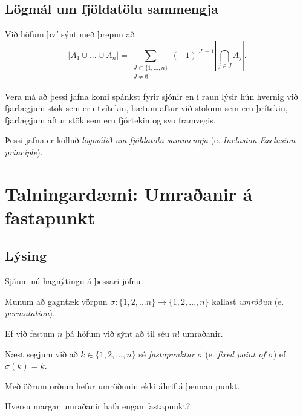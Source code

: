 \subsection{Lögmál um fjöldatölu sammengja}
{
    {
        \item<1-> Við höfum því sýnt með þrepun að
        \[
            |A_1 \cup ... \cup A_n|
            =
            \sum_{\substack{J \subset \{1, ..., n\} \\ J \neq \emptyset}} (-1)^{|J| - 1} \left | \bigcap_{j \in J} A_j \right |.
        \]
        \item<2-> Vera má að þessi jafna komi spánkst fyrir sjónir en í raun lýsir hún hvernig við fjarlægjum stök sem eru tvítekin,
                    bætum aftur við stökum sem eru þrítekin,
                    fjarlægjum aftur stök sem eru fjórtekin
                    og svo framvegis.
        \item<3-> Þessi jafna er kölluð \emph{lögmálið um fjöldatölu sammengja} (e. \emph{Inclusion-Exclusion principle}).
    }
}

\section{Talningardæmi: Umraðanir á fastapunkt}
\subsection{Lýsing}
{
    {
        \item<1-> Sjáum nú hagnýtingu á þessari jöfnu.
        \item<2-> Munum að gagntæk vörpun $\sigma \colon \{1, 2, ... n\} \rightarrow \{1, 2, ..., n\}$ kallast \emph{umröðun} (e. \emph{permutation}).
        \item<3-> Ef við festum $n$ þá höfum við sýnt að til séu $n!$ umraðanir.
        \item<4-> Næst segjum við að $k \in \{1, 2, ..., n\}$ sé \emph{fastapunktur $\sigma$} (e. \emph{fixed point of $\sigma$}) ef $\sigma(k) = k$.
        \item<5-> Með öðrum orðum hefur umröðunin ekki áhrif á þennan punkt.
        \item<6-> Hversu margar umraðanir hafa engan fastapunkt?
    }
}

